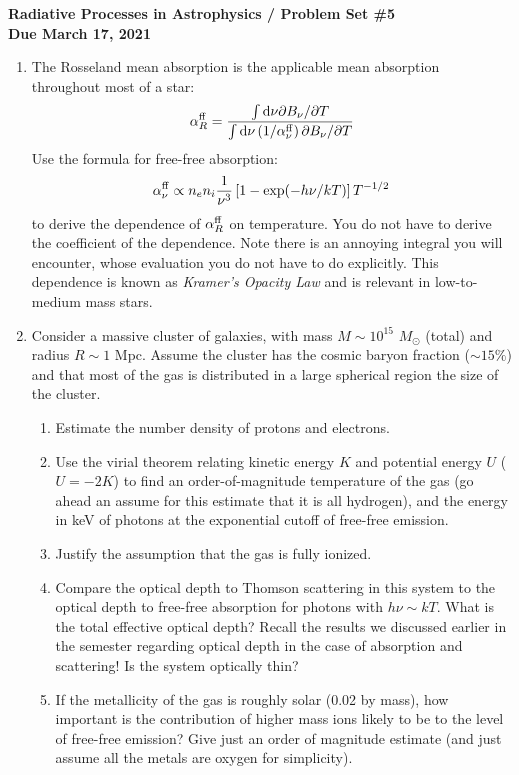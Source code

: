 \documentclass[11pt, preprint]{article}
\begin{document}
\begin{center}
  {\bf Radiative Processes in Astrophysics / Problem Set \#5 \\
    Due March 17, 2021}
\end{center}

\begin{enumerate}
\item 
  The Rosseland mean absorption is the applicable mean absorption
  throughout most of a star:
  \begin{equation}
    \alpha_R^{\rm ff} = \frac{\int {\rm d}\nu \partial B_\nu /
      \partial T}
    {\int {\rm d}\nu \left(1/\alpha_\nu^{\rm ff}\right) \partial B_\nu / \partial T}
  \end{equation}
  Use the formula for free-free absorption:
  \begin{equation}
    \alpha_\nu^{\rm ff} \propto n_e n_i \frac{1}{\nu^3} \left[1 -
      \exp(-h\nu/ kT)\right] T^{-1/2}
  \end{equation}
  to derive the dependence of $\alpha_R^{\rm ff}$ on temperature. You
  do not have to derive the coefficient of the dependence. Note there
  is an annoying integral you will encounter, whose evaluation you do
  not have to do explicitly. This dependence is known as {\it Kramer's
    Opacity Law} and is relevant in low-to-medium mass stars.

\item Consider a massive cluster of galaxies, with mass $M\sim
  10^{15}$ $M_\odot$ (total) and radius $R\sim 1$ Mpc. Assume
  the cluster has the cosmic baryon fraction ($\sim 15\%$) and that
  most of the gas is distributed in a large spherical region the size
  of the cluster.
\begin{enumerate}
  \item Estimate the number density of protons and electrons. 
  \item Use the virial theorem relating kinetic energy $K$ and
    potential energy $U$ ($U = -2K$) to find an order-of-magnitude
    temperature of the gas (go ahead an assume for this estimate that
    it is all hydrogen), and the energy in keV of photons at the
    exponential cutoff of free-free emission.
  \item Justify the assumption that the gas is fully ionized.
  \item Compare the optical depth to Thomson scattering in this system
    to the optical depth to free-free absorption for photons with
    $h\nu \sim kT$. What is the total effective optical depth? Recall
    the results we discussed earlier in the semester regarding optical
    depth in the case of absorption and scattering! Is the system
    optically thin?
  \item If the metallicity of the gas is roughly solar (0.02 by mass),
    how important is the contribution of higher mass ions likely to be
    to the level of free-free emission? Give just an order of
    magnitude estimate (and just assume all the metals are oxygen for
    simplicity).
\end{enumerate}

\end{enumerate}
\end{document}
